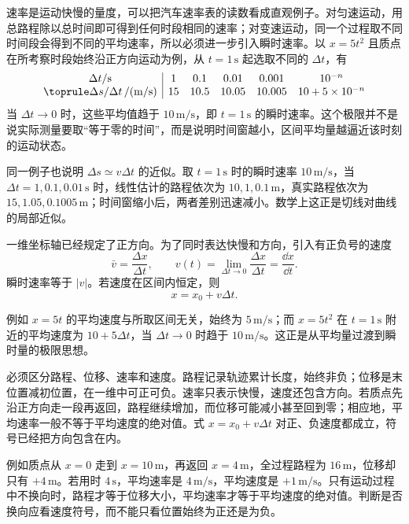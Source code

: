 速率是运动快慢的量度，可以把汽车速率表的读数看成直观例子。对匀速运动，用总路程除以总时间即可得到任何时段相同的速率；对变速运动，同一个过程取不同时间段会得到不同的平均速率，所以必须进一步引入瞬时速率。以 $x=5t^2$ 且质点在所考察时段始终沿正方向运动为例，从 $t=1\,\mathrm{s}$ 起选取不同的 $\Delta t$，有
\[
\begin{array}{c|ccccc}
\Delta t/\mathrm s&1&0.1&0.01&0.001&10^{-n}\\\toprule
\Delta s/\Delta t\,/\mathrm{(m/s)}&15&10.5&10.05&10.005&10+5\times10^{-n}
\end{array}
\]
当 $\Delta t\to0$ 时，这些平均值趋于 $10\,\mathrm{m/s}$，即 $t=1\,\mathrm{s}$ 的瞬时速率。这个极限并不是说实际测量要取“等于零的时间”，而是说明时间窗越小，区间平均量越逼近该时刻的运动状态。

同一例子也说明 $\Delta s\simeq v\Delta t$ 的近似。取 $t=1\,\mathrm{s}$ 时的瞬时速率 $10\,\mathrm{m/s}$，当 $\Delta t=1,0.1,0.01\,\mathrm{s}$ 时，线性估计的路程依次为 $10,1,0.1\,\mathrm{m}$，真实路程依次为 $15,1.05,0.1005\,\mathrm{m}$；时间窗缩小后，两者差别迅速减小。数学上这正是切线对曲线的局部近似。

一维坐标轴已经规定了正方向。为了同时表达快慢和方向，引入有正负号的速度
\begin{equation}
  \bar v=\frac{\Delta x}{\Delta t},\qquad
  v(t)=\lim_{\Delta t\to0}\frac{\Delta x}{\Delta t}=\frac{\dd x}{\dd t}.
\end{equation}
瞬时速率等于 $|v|$。若速度在区间内恒定，则
\begin{equation}
  x=x_0+v\Delta t.
\end{equation}

例如 $x=5t$ 的平均速度与所取区间无关，始终为 $5\,\mathrm{m/s}$；而 $x=5t^2$ 在 $t=1\,\mathrm{s}$ 附近的平均速度为 $10+5\Delta t$，当 $\Delta t\to0$ 时趋于 $10\,\mathrm{m/s}$。这正是从平均量过渡到瞬时量的极限思想。

必须区分路程、位移、速率和速度。路程记录轨迹累计长度，始终非负；位移是末位置减初位置，在一维中可正可负。速率只表示快慢，速度还包含方向。若质点先沿正方向走一段再返回，路程继续增加，而位移可能减小甚至回到零；相应地，平均速率一般不等于平均速度的绝对值。式 $x=x_0+v\Delta t$ 对正、负速度都成立，符号已经把方向包含在内。

例如质点从 $x=0$ 走到 $x=10\,\mathrm m$，再返回 $x=4\,\mathrm m$，全过程路程为 $16\,\mathrm m$，位移却只有 $+4\,\mathrm m$。若用时 $4\,\mathrm s$，平均速率是 $4\,\mathrm{m/s}$，平均速度是 $+1\,\mathrm{m/s}$。只有运动过程中不换向时，路程才等于位移大小，平均速率才等于平均速度的绝对值。判断是否换向应看速度符号，而不能只看位置始终为正还是为负。


